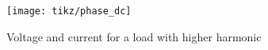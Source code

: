 \begin{figure}
	\centering
	\texttt{[image: tikz/phase\_dc]}
	\caption[Voltage and current for a load with higher harmonic]{Voltage and current for a load with higher harmonic}
	\label{fig:phase_dc}
\end{figure}
